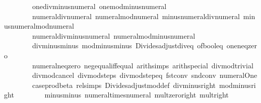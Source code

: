 \begin{isabellebody}
\ \ \ \ \ \ \ \ one{\isacharunderscore}{\kern0pt}div{\isacharunderscore}{\kern0pt}minus{\isacharunderscore}{\kern0pt}numeral\ one{\isacharunderscore}{\kern0pt}mod{\isacharunderscore}{\kern0pt}minus{\isacharunderscore}{\kern0pt}numeral\isanewline
\ \ \ \ \ \ \ \ numeral{\isacharunderscore}{\kern0pt}div{\isacharunderscore}{\kern0pt}numeral\ numeral{\isacharunderscore}{\kern0pt}mod{\isacharunderscore}{\kern0pt}numeral\ minus{\isacharunderscore}{\kern0pt}numeral{\isacharunderscore}{\kern0pt}div{\isacharunderscore}{\kern0pt}numeral\ minus{\isacharunderscore}{\kern0pt}numeral{\isacharunderscore}{\kern0pt}mod{\isacharunderscore}{\kern0pt}numeral\isanewline
\ \ \ \ \ \ \ \ numeral{\isacharunderscore}{\kern0pt}div{\isacharunderscore}{\kern0pt}minus{\isacharunderscore}{\kern0pt}numeral\ numeral{\isacharunderscore}{\kern0pt}mod{\isacharunderscore}{\kern0pt}minus{\isacharunderscore}{\kern0pt}numeral\isanewline
\ \ \ \ \ \ \ \ div{\isacharunderscore}{\kern0pt}minus{\isacharunderscore}{\kern0pt}minus\ mod{\isacharunderscore}{\kern0pt}minus{\isacharunderscore}{\kern0pt}minus\ Divides{\isachardot}{\kern0pt}adjust{\isacharunderscore}{\kern0pt}div{\isacharunderscore}{\kern0pt}eq\ of{\isacharunderscore}{\kern0pt}bool{\isacharunderscore}{\kern0pt}eq\ one{\isacharunderscore}{\kern0pt}neq{\isacharunderscore}{\kern0pt}zero\isanewline
\ \ \ \ \ \ \ \ numeral{\isacharunderscore}{\kern0pt}neq{\isacharunderscore}{\kern0pt}zero\ neg{\isacharunderscore}{\kern0pt}equal{\isacharunderscore}{\kern0pt}{}{\isacharunderscore}{\kern0pt}iff{\isacharunderscore}{\kern0pt}equal\ arith{\isacharunderscore}{\kern0pt}simps\ arith{\isacharunderscore}{\kern0pt}special\ divmod{\isacharunderscore}{\kern0pt}trivial\isanewline
\ \ \ \ \ \ \ \ divmod{\isacharunderscore}{\kern0pt}cancel\ divmod{\isacharunderscore}{\kern0pt}steps\ divmod{\isacharunderscore}{\kern0pt}step{\isacharunderscore}{\kern0pt}eq\ fst{\isacharunderscore}{\kern0pt}conv\ snd{\isacharunderscore}{\kern0pt}conv\ numeral{\isacharunderscore}{\kern0pt}One\isanewline
\ \ \ \ \ \ \ \ case{\isacharunderscore}{\kern0pt}prod{\isacharunderscore}{\kern0pt}beta\ rel{\isacharunderscore}{\kern0pt}simps\ Divides{\isachardot}{\kern0pt}adjust{\isacharunderscore}{\kern0pt}mod{\isacharunderscore}{\kern0pt}def\ div{\isacharunderscore}{\kern0pt}minus{}{\isacharunderscore}{\kern0pt}right\ mod{\isacharunderscore}{\kern0pt}minus{}{\isacharunderscore}{\kern0pt}right\isanewline
\ \ \ \ \ \ \ \ minus{\isacharunderscore}{\kern0pt}minus\ numeral{\isacharunderscore}{\kern0pt}times{\isacharunderscore}{\kern0pt}numeral\ mult{\isacharunderscore}{\kern0pt}zero{\isacharunderscore}{\kern0pt}right\ mult{\isacharunderscore}{\kern0pt}{}{\isacharunderscore}{\kern0pt}right{\isacharbraceright}{\kern0pt}\isanewline

\end{isabellebody}
